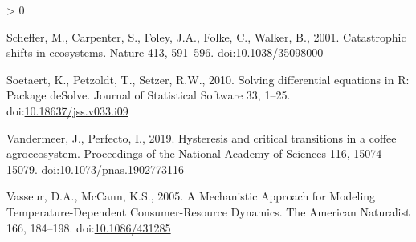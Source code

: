 \documentclass[]{elsarticle} %
\newlength{\cslhangindent}
\newenvironment{CSLReferences}[2] %
 {%
  \setlength{\parindent}{0pt}
  \ifodd #1 \everypar{\setlength{\hangindent}{\cslhangindent}}\ignorespaces\fi
  \ifnum #2 > 0
  \setlength{\parskip}{#2\baselineskip}
  \fi
 }%
 {}
\begin{document}
\begin{CSLReferences}{1}{0}
\leavevmode\hypertarget{ref-Scheffer2001}{}%
Scheffer, M., Carpenter, S., Foley, J.A., Folke, C., Walker, B., 2001.
Catastrophic shifts in ecosystems. Nature 413, 591--596.
doi:\href{https://doi.org/10.1038/35098000}{10.1038/35098000}

\leavevmode\hypertarget{ref-Soetaert2010}{}%
Soetaert, K., Petzoldt, T., Setzer, R.W., 2010. Solving differential
equations in {R}: {Package deSolve}. Journal of Statistical Software 33,
1--25.
doi:\href{https://doi.org/10.18637/jss.v033.i09}{10.18637/jss.v033.i09}

\leavevmode\hypertarget{ref-Vandermeer2019}{}%
Vandermeer, J., Perfecto, I., 2019. Hysteresis and critical transitions
in a coffee agroecosystem. Proceedings of the National Academy of
Sciences 116, 15074--15079.
doi:\href{https://doi.org/10.1073/pnas.1902773116}{10.1073/pnas.1902773116}

\leavevmode\hypertarget{ref-Vasseur2005}{}%
Vasseur, D.A., McCann, K.S., 2005. A {Mechanistic Approach} for
{Modeling Temperature}-{Dependent Consumer}-{Resource Dynamics}. The
American Naturalist 166, 184--198.
doi:\href{https://doi.org/10.1086/431285}{10.1086/431285}

\end{CSLReferences}
\end{document}
